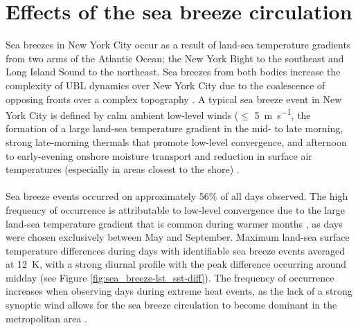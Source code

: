\documentclass[11pt,a4paper]{article}
\begin{document}

\section{Effects of the sea breeze circulation} \label{section:sea_breeze_effects} 
Sea breezes in New York City occur as a result of land-sea temperature gradients from two arms of the Atlantic Ocean; the New York Bight to the southeast and Long Island Sound to the northeast. Sea breezes from both bodies increase the complexity of UBL dynamics over New York City due to the coalescence of opposing fronts over a complex topography \citep{bornstein1981}. A typical sea breeze event in New York City is defined by calm ambient low-level winds ($\leq$ \SI{5}{\meter\per\second}, the formation of a large land-sea temperature gradient in the mid- to late morning, strong late-morning thermals that promote low-level convergence, and afternoon to early-evening onshore moisture transport and reduction in surface air temperatures (especially in areas closest to the shore) \citep{childs2005, frizzola1963, gedzelman2003}. 
\\ \\
Sea breeze events occurred on approximately 56\% of all days observed. The high frequency of occurrence is  attributable to low-level convergence due to  the large land-sea temperature gradient that is common during warmer months \citep{childs2005, gedzelman2003, thompson2007}, as days were chosen exclusively between May and September. Maximum land-sea surface temperature differences during days with identifiable sea breeze events averaged at \SI{12}{\kelvin}, with a strong diurnal profile with the peak difference occurring around midday (see Figure \ref{fig:sea_breeze-lst_sst-diff}). The frequency of occurrence increases when observing days during extreme heat events, as the lack of a strong synoptic wind allows for the sea breeze circulation to become dominant in the metropolitan area \citep{miller2003}. 
\end{document}
